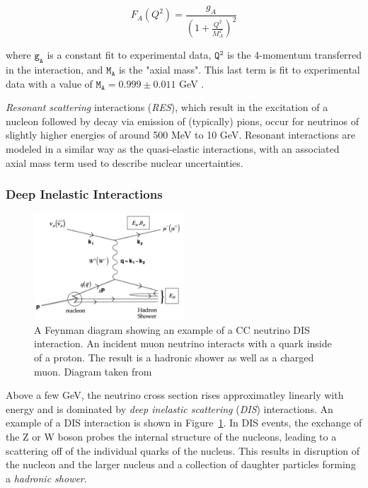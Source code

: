 \begin{equation}
F_A\left(Q^2\right) = \frac{g_A}{\left(1+\frac{Q^2}{M_A^2}\right)^2}
\label{eq:axial_mass_eq}
\end{equation}

where $\mathtt{g_A}$ is a constant fit to experimental data, $\mathtt{Q^2}$ is the 4-momentum transferred in the interaction, and $\mathtt{M_A}$ is the "axial mass".
This last term is fit to experimental data with a value of $\mathtt{M_A = 0.999 \pm 0.011}$ GeV \cite{Formaggio-Xsec}.

\emph{Resonant scattering} interactions (\emph{RES}), which result in the excitation of a nucleon followed by decay via emission of (typically) pions, occur for neutrinos of slightly higher energies of around 500 MeV to 10 GeV.
Resonant interactions are modeled in a similar way as the quasi-elastic interactions, with an associated axial mass term used to describe nuclear uncertainties.

\subsubsection{Deep Inelastic Interactions}
\begin{figure}
\centering
\includegraphics[width=0.5\textwidth]{dis_feynman.png}
\caption{A Feynman diagram showing an example of a CC neutrino DIS interaction. An incident muon neutrino interacts with a quark inside of a proton. The result is a hadronic shower as well as a charged muon. Diagram taken from \cite{formaggio-xsec}}
\label{fig:dis_feynman}
\end{figure}

Above a few GeV, the neutrino cross section rises approximatley linearly with energy and is dominated by \emph{deep inelastic scattering} (\emph{DIS}) interactions.
An example of a DIS interaction is shown in Figure~\ref{fig:dis_feynman}.
In DIS events, the exchange of the Z or W boson probes the internal structure of the nucleons, leading to a scattering off of the individual quarks of the nucleus.
This results in disruption of the nucleon and the larger nucleus and a collection of daughter particles forming a \emph{hadronic shower}.

